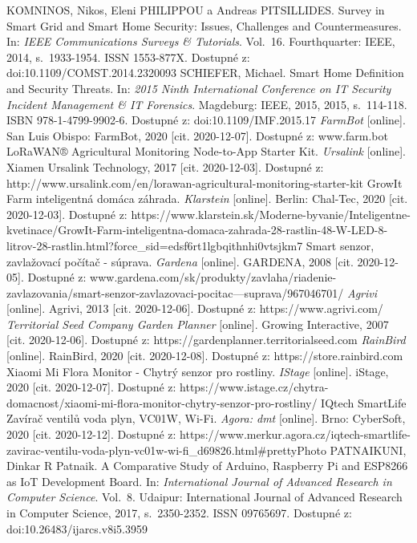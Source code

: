 \documentclass[twoside]{ctuthesis}
\theoremstyle{plain}
\theoremstyle{definition}
\theoremstyle{note}
\begin{document}
\begin{thebibliography}{46}
KOMNINOS, Nikos, Eleni PHILIPPOU a Andreas PITSILLIDES. Survey in Smart Grid and Smart Home Security: Issues, Challenges and Countermeasures. In: \textit{IEEE Communications Surveys \& Tutorials}. Vol.~16. Fourthquarter: IEEE, 2014, s.~1933-1954. ISSN 1553-877X. Dostupné z: doi:10.1109/COMST.2014.2320093
SCHIEFER, Michael. Smart Home Definition and Security Threats. In: \textit{2015 Ninth International Conference on IT Security Incident Management \& IT Forensics}. Magdeburg: IEEE, 2015, 2015, s.~114-118. ISBN 978-1-4799-9902-6. Dostupné z: doi:10.1109/IMF.2015.17
 \textit{FarmBot} [online]. San Luis Obispo: FarmBot, 2020 [cit. 2020-12-07]. Dostupné z: www.farm.bot
LoRaWAN® Agricultural Monitoring Node-to-App Starter Kit. \textit{Ursalink} [online]. Xiamen Ursalink Technology, 2017 [cit. 2020-12-03]. Dostupné z: http://www.ursalink.com/en/lorawan-agricultural-monitoring-starter-kit
GrowIt Farm inteligentná domáca záhrada. \textit{Klarstein} [online]. Berlin: Chal-Tec, 2020 [cit. 2020-12-03]. Dostupné z: https://www.klarstein.sk/Moderne-byvanie/Inteligentne-kvetinace/GrowIt-Farm-inteligentna-domaca-zahrada-28-rastlin-48-W-LED-8-litrov-28-rastlin.html?force\_sid=edsf6rt1lgbqithnhi0vtsjkm7
 Smart senzor, zavlažovací počítač - súprava. \textit{Gardena} [online]. GARDENA, 2008 [cit. 2020-12-05]. Dostupné z: www.gardena.com/sk/produkty/zavlaha/riadenie-zavlazovania/smart-senzor-zavlazovaci-pocitac---suprava/967046701/
 \textit{Agrivi} [online]. Agrivi, 2013 [cit. 2020-12-06]. Dostupné z: https://www.agrivi.com/
 \textit{Territorial Seed Company Garden Planner} [online]. Growing Interactive, 2007 [cit. 2020-12-06]. Dostupné z: https://gardenplanner.territorialseed.com
 \textit{RainBird} [online]. RainBird, 2020 [cit. 2020-12-08]. Dostupné z: https://store.rainbird.com
 Xiaomi Mi Flora Monitor - Chytrý senzor pro rostliny. \textit{IStage} [online]. iStage, 2020 [cit. 2020-12-07]. Dostupné z: https://www.istage.cz/chytra-domacnost/xiaomi-mi-flora-monitor-chytry-senzor-pro-rostliny/
IQtech SmartLife Zavírač ventilů voda plyn, VC01W, Wi-Fi. \textit{Agora: dmt} [online]. Brno: CyberSoft, 2020 [cit. 2020-12-12]. Dostupné z: https://www.merkur.agora.cz/iqtech-smartlife-zavirac-ventilu-voda-plyn-vc01w-wi-fi\_d69826.html\#prettyPhoto
 PATNAIKUNI, Dinkar R Patnaik. A Comparative Study of Arduino, Raspberry Pi and ESP8266 as IoT Development Board. In: \textit{International Journal of Advanced Research in Computer Science}. Vol.~8. Udaipur: International Journal of Advanced Research in Computer Science, 2017, s.~2350-2352. ISSN 09765697. Dostupné z: doi:10.26483/ijarcs.v8i5.3959

\end{thebibliography}
\end{document}
